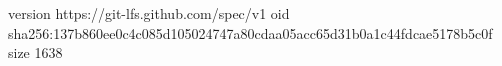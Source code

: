 version https://git-lfs.github.com/spec/v1
oid sha256:137b860ee0c4c085d105024747a80cdaa05acc65d31b0a1c44fdcae5178b5c0f
size 1638
